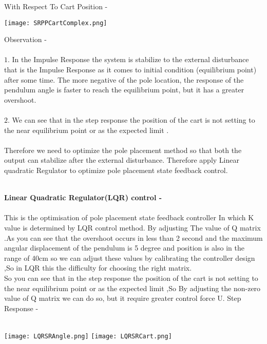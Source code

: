 \documentclass[11pt]{article}
\begin{document}
{With Respect To Cart Position - \\
\begin{center}
\texttt{[image: SRPPCartComplex.png]}
\end{center}


Observation - \\\\
$1.$ In the Impulse Response the system is stabilize to the external disturbance that is the Impulse Response as it comes to initial condition (equilibrium point) after some time. The more negative of the pole location, the response of the pendulum angle is faster to reach the equilibrium point, but it has a greater overshoot. \\\\
$2.$ We can see that in the step response the position of the cart is not setting to the near equilibrium point or as the expected limit .\\\\
Therefore we need to optimize the pole placement method so that both the output can stabilize after the external disturbance. Therefore apply Linear quadratic Regulator to optimize pole placement state feedback control. 
}\\






{\textbf{Linear Quadratic Regulator(LQR) control - \\\\}}
This is the optimisation of pole placement state feedback controller In which K value is determined by LQR control method. By adjusting The value of Q matrix .As you can see that the overshoot occurs in less than 2 second and the maximum angular displacement of the pendulum is 5 degree and position is also in the range of 40cm so we can adjust these values by calibrating the controller design ,So in LQR this the difficulty for choosing the right matrix.\\
So you can see that in the step response the position of the cart is not setting to the near equilibrium point or as the expected limit  ,So By adjusting the non-zero value of Q matrix we can do so, but it require greater control force U. 
\newpage
Step Response - \\\\ 
\begin{center}
\texttt{[image: LQRSRAngle.png]}
\texttt{[image: LQRSRCart.png]}
\end{center}
\end{document}
